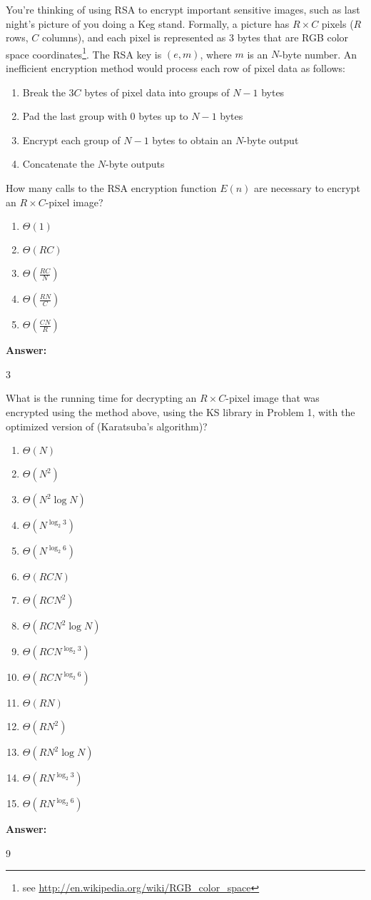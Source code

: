 \documentclass[12pt,twoside]{article}
\newcommand{\answer}{
 \par\medskip
 \textbf{Answer:}
}
\newcommand{\answerIIb}{ \answer
3
}
\newcommand{\answerIIc}{ \answer
9
}
\begin{document}
\begin{problems}
\begin{problemparts}
\end{problemparts}

You're thinking of using RSA to encrypt important sensitive images, such as
last night's picture of you doing a Keg stand. Formally, a picture has $R \times
C$ pixels ($R$ rows, $C$ columns), and each pixel is represented as 3 bytes that
are RGB color space coordinates\footnote{see
\url{http://en.wikipedia.org/wiki/RGB_color_space}}. The RSA key is $(e, m)$,
where $m$ is an $N$-byte number. An inefficient encryption method would process
each row of pixel data as follows:
\begin{enumerate}
  \item Break the $3C$ bytes of pixel data into groups of $N-1$ bytes
  \item Pad the last group with 0 bytes up to $N-1$ bytes
  \item Encrypt each group of $N-1$ bytes to obtain an $N$-byte output
  \item Concatenate the $N$-byte outputs 
\end{enumerate}

\begin {problemparts}
\problempart {} How many calls to the RSA encryption function $E(n)$
are necessary to encrypt an $R \times C$-pixel image?
\begin{enumerate}
  \item $\Theta(1)$
  \item $\Theta(R C)$
  \item $\Theta(\frac{RC}{N})$
  \item $\Theta(\frac{RN}{C})$
  \item $\Theta(\frac{CN}{R})$
\end{enumerate}
\answerIIb

\problempart {} What is the running time for decrypting an $R \times
C$-pixel image that was encrypted using the method above, using the KS library
in Problem 1, with the optimized version of  (Karatsuba's
algorithm)?
\begin{enumerate}
  \item $\Theta(N)$
  \item $\Theta(N^2)$
  \item $\Theta(N^2 \log N)$
  \item $\Theta(N^{\log_2 3})$
  \item $\Theta(N^{\log_2 6})$
  \item $\Theta(R C N)$
  \item $\Theta(R C N^2)$
  \item $\Theta(R C N^2 \log N)$
  \item $\Theta(R C N^{\log_2 3})$
  \item $\Theta(R C N^{\log_2 6})$
  \item $\Theta(R N)$
  \item $\Theta(R N^2)$
  \item $\Theta(R N^2 \log N)$
  \item $\Theta(R N^{\log_2 3})$
  \item $\Theta(R N^{\log_2 6})$
\end{enumerate}
\answerIIc


\end{problemparts}
\end{problems}
\end{document}
